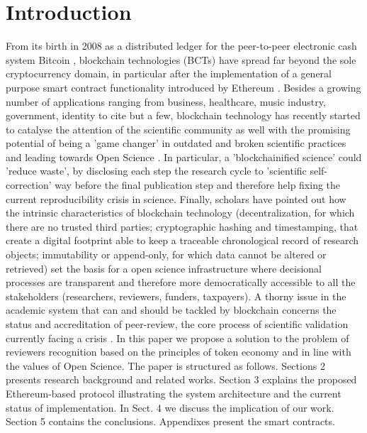 \documentclass[runningheads]{llncs}
\begin{document}
\section{Introduction}
From its birth in 2008 as a distributed ledger for the peer-to-peer electronic cash system Bitcoin \cite{Bitcoin}, blockchain technologies (BCTs) have spread far beyond the sole cryptocurrency domain, in particular after the implementation of a general purpose smart contract functionality introduced by Ethereum \cite{Ethereum-Wood}.
Besides a growing number of applications ranging from business, healthcare, music industry, government, identity to cite but a few, blockchain technology has recently started to catalyse the attention of the scientific community as well \cite{Bitcoin-Nature-focus,vanRossum2017-DigSci} with the promising potential of being a 'game changer' in outdated and broken scientific practices and leading towards Open Science \cite{AES}. In particular, a 'blockchainified science'\cite{BlockchainforScience} could 'reduce waste'\cite{ReducingWaste-Lancet}, by disclosing each step the research cycle to 'scientific self-correction' way before the final publication step and therefore help fixing the current reproducibility crisis in science. Finally, scholars have pointed out how the intrinsic characteristics of blockchain technology (decentralization, for which there are no trusted third parties; cryptographic hashing and timestamping, that create a digital footprint able to keep a traceable chronological record of research objects; immutability or append-only, for which data cannot be altered or retrieved) set the basis for a open science infrastructure \cite{ReviewBlockchain2019} where decisional processes are transparent and therefore more democratically accessible to all the stakeholders (researchers, reviewers, funders, taxpayers).
A thorny issue in the academic system that can and should be tackled by blockchain concerns the status and accreditation of peer-review, the core process of scientific validation currently facing a crisis \cite{Gropp-PeerRevStress}. 
In this paper we propose a solution to the problem of reviewers recognition based on the principles of token economy and in line with the values of Open Science.
\newline The paper is structured as follows. Sections 2 presents research background and related works. Section 3 explains the proposed Ethereum-based protocol illustrating the system architecture and the current status of implementation. In Sect. 4 we discuss the implication of our work. Section 5 contains the conclusions. Appendixes present the smart contracts. 
\end{document}
